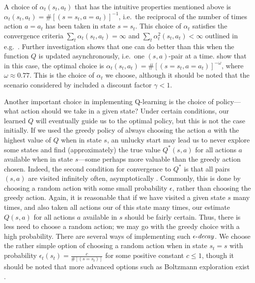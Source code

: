 A choice of $\alpha_t(s_t,a_t)$ that has the intuitive properties mentioned above is $\alpha_t(s_t,a_t) = \#[(s=s_t,a=a_t)]^{-1}$,
i.e.\ the reciprocal of the number of times action $a = a_t$ has been taken in state $s=s_t$. This choice of $\alpha_t$ satisfies
the convergence criteria $\sum_t \alpha_t(s_t,a_t) = \infty$ and $\sum_t \alpha^2_t(s_t,a_t) < \infty$ outlined in e.g.\ 
\citet{Watkins1992}. Further investigation shows that one can do better than this when the function $Q$ is updated 
asynchronously, i.e.\ one $(s,a)$-pair at a time. \citet{EvenDar2003} show that in this case, the optimal choice is 
$\alpha_t(s_t,a_t) = \#[(s=s_t,a=a_t)]^{-\omega}$, where $\omega \approx 0.77$. This is the choice of $\alpha_t$ we choose,
although it should be noted that the scenario considered by \citet{EvenDar2003} included a discount factor $\gamma < 1$.

Another important choice in implementing Q-learning is the choice of policy---what action should we take in a given state? 
Under certain conditions, our learned $Q$ will eventually guide us to the optimal policy, but this is not the case initially.
If we used the greedy policy of always choosing the action $a$ with the highest value of $Q$ when in state $s$, an unlucky
start may lead us to never explore some states and find (approximately) the true value $Q^*(s,a)$ for all actions $a$ 
available when in state $s$---some perhaps more valuable than the greedy action chosen. Indeed, the second condition for 
convergence to $Q^*$ is that all pairs $(s, a)$ are visited infinitely often, asymptotically \citep{RLDP}.
Commonly, this is done by choosing a random action with some small probability $\epsilon$, rather than choosing the greedy action.
Again, it is reasonable that if we have visited a given state $s$ many times, and also taken all actions our of this state
many times, our estimate $Q(s,a)$ for all actions $a$ available in $s$ should be fairly certain. Thus, there is less need to
choose a random action; we may go with the greedy choice with a high probability. There are several ways of implementing such
$\epsilon\text{-\emph{decay}}$. We choose the rather simple option of choosing a random action when in state $s_t=s$ with probability 
$\epsilon_t(s_t) = \frac{c}{\#[(s=s_t)]}$ for some positive constant $c \leq 1$, though it should be noted that more advanced options 
such as Boltzmann exploration exist \citep{RLDP}.

